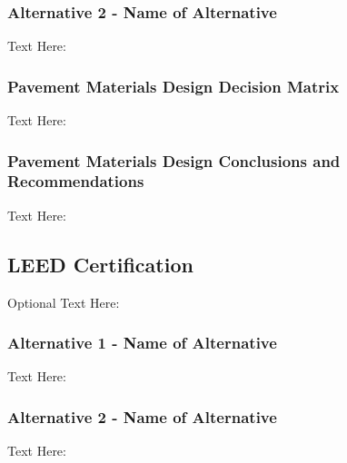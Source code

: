 \documentclass{ceri}
\begin{document}
\subsubsection{Alternative 2 - Name of Alternative}
Text Here:

\subsubsection{Pavement Materials Design Decision Matrix}
Text Here:

\begin{table}[H]
\centering
\caption{Pavement Materials Design Decision Matrix}
\label{my-label}
\end{table}

\subsubsection{Pavement Materials Design Conclusions and Recommendations}
Text Here:

\subsection{LEED Certification}
Optional Text Here:

\subsubsection{Alternative 1 - Name of Alternative}
Text Here:



\subsubsection{Alternative 2 - Name of Alternative}
Text Here:
\end{document}
